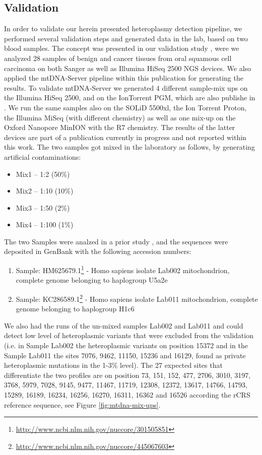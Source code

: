 \subsection{Validation}
In order to validate our herein presented heteroplasmy detection pipeline, we performed several validation steps and generated data in the lab, based on two blood samples. The concept was presented in our validation study \cite{Kloss-Brandstatter2015}, were we analyzed 28 samples of benign and cancer tissues from oral squamous cell carcinoma on both Sanger as well as Illumina HiSeq 2500 NGS devices. We also applied the mtDNA-Server pipeline within this publication for generating the results. To validate mtDNA-Server we generated 4 different sample-mix ups on the Illumina HiSeq 2500, and on the IonTorrent
PGM, which are also publishe in \cite{Weissensteiner2016b,Kloss-Brandstatter2015}. We run the same samples also on the SOLiD 5500xl, the Ion Torrent Proton, the Illumina MiSeq (with different chemistry) as well as one mix-up on the Oxford Nanopore MinION with the R7 chemistry. The results of the latter devices are part of a publication currently in progress and not reported within this work. The two samples got mixed in the laboratory as follows, by generating artificial contaminations: 
\begin{itemize}
\item Mix1 – 1:2 (50\%) 
\item Mix2 – 1:10 (10\%) 
\item Mix3 – 1:50 (2\%) 
\item Mix4 – 1:100 (1\%)
\end{itemize}
The two Samples were analzed in a prior study \cite{KlossBrandstatter2010}, and the sequences were deposited in GenBank with the following accession numbers:
\begin{enumerate}
\item Sample: HM625679.1\footnote{\url{http://www.ncbi.nlm.nih.gov/nuccore/301505851}} - Homo sapiens isolate Lab002 mitochondrion, complete genome  belonging to haplogroup U5a2e
\item Sample: KC286589.1\footnote{\url{http://www.ncbi.nlm.nih.gov/nuccore/445067603}} - Homo sapiens isolate Lab011 mitochondrion, complete genome  belonging to haplogroup H1c6
\end{enumerate}
We also had the runs of the un-mixed samples Lab002 and Lab011 and could detect low level of heteroplasmic variants that were excluded from the validation (i.e. in Sample Lab002 the heteroplasmic variants on position  15372 and in the Sample Lab011 the sites 7076, 9462, 11150, 15236 and 16129, found as private heteroplasmic mutations in the 1-3\% level). The 27 expected sites that differentiate the two profiles are on position 73, 151, 152, 477, 2706, 3010, 3197, 3768, 5979, 7028, 9145, 9477, 11467, 11719,
12308, 12372, 13617, 14766, 14793, 15289, 16189, 16234, 16256, 16270, 16311, 16362 and 16526 according the rCRS reference sequence, see Figure \ref{fig:mtdna-mix-ups}. 

